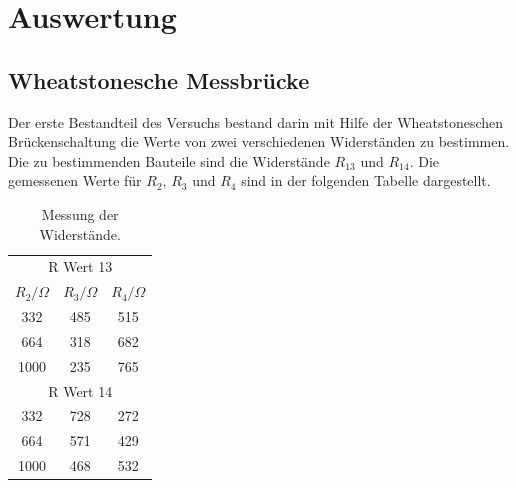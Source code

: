 \section{Auswertung}
\subsection{Wheatstonesche Messbrücke}
Der erste Bestandteil des Versuchs bestand darin mit Hilfe der Wheatstoneschen Brückenschaltung die Werte von zwei verschiedenen Widerständen zu bestimmen.
Die zu bestimmenden Bauteile sind die Widerstände $R_\text{13}$ und $R_\text{14}$.
Die gemessenen Werte für $R_2$, $R_3$ und $R_4$ sind in der folgenden Tabelle dargestellt.

\begin{table}[h!]
    \begin{center}
      \caption{Messung der Widerstände.}
      \label{tab:Tabelle 1}
      \begin{tabular}{c|c|c} 
        \multicolumn{3}{c}{R Wert 13} \\
        \textbf{$R_2 / \Omega$ } & \textbf{$R_3 / \Omega$} & \textbf{$R_4 / \Omega$}\\
        \hline
        332 & 485 & 515\\
        664 & 318 & 682\\
        1000 & 235 & 765\\
        \multicolumn{3}{c}{R Wert 14} \\
        \hline
        332 & 728 & 272\\
        664 & 571 & 429\\
        1000 & 468 & 532\\
      \end{tabular}
    \end{center}
\end{table}

